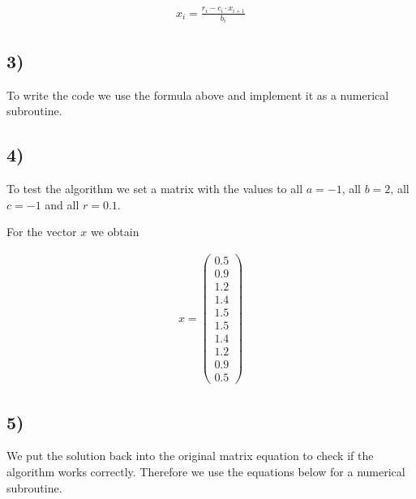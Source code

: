 \documentclass[11pt, a4paper, reqno]{scrartcl}
\begin{document}
			\begin{align}
				x_i = \frac{r_i - c_i \cdot x_{i+1}}{b_i}
			\end{align}			    		
    	
    	\subsection*{3)}
    		To write the code we use the formula above and implement it as a 					numerical subroutine.
    		
    		\begin{figure}[H]
        		        
    		\end{figure}
    	
    	\subsection*{4)}
    		To test the algorithm we set a matrix with the values to all $a = -1$, 				all $b = 2$, all $c = -1$ and all $r = 0.1$.
    		
    		\begin{figure}[H]
        		        
    		\end{figure}
    		
    		For the vector $x$ we obtain
    		
    		\begin{align*}
    			x =
    			\begin{pmatrix}
    				0.5 \\
    				0.9 \\
    				1.2 \\
    				1.4 \\
    				1.5 \\
    				1.5 \\
    				1.4 \\
    				1.2 \\
    				0.9 \\
    				0.5 
    			\end{pmatrix}
    		\end{align*}
  
    	\subsection{5)}
    		We put the solution back into the original matrix equation to check if 				the algorithm works correctly. Therefore we use the equations below for 			a numerical subroutine.
    		
\end{document}
